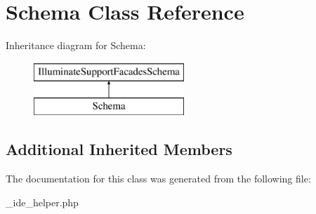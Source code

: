 \hypertarget{class_schema}{}\section{Schema Class Reference}
\label{class_schema}
Inheritance diagram for Schema\+:\begin{figure}[H]
\begin{center}
\leavevmode
\includegraphics[height=2.000000cm]{class_schema}
\end{center}
\end{figure}
\subsection*{Additional Inherited Members}


The documentation for this class was generated from the following file\+:\begin{DoxyCompactItemize}
\item 
\+\_\+ide\+\_\+helper.\+php\end{DoxyCompactItemize}
